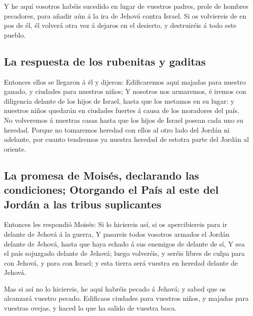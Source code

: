  Y he aquí vosotros habéis sucedido en lugar de vuestros
padres, prole de hombres pecadores, para añadir aún á la ira de Jehová
contra Israel.  Si os volviereis de en pos de él, él
volverá otra vez á dejaros en el desierto, y destruiréis á todo este
pueblo.

\hypertarget{la-respuesta-de-los-rubenitas-y-gaditas}{%
\subsection{La respuesta de los rubenitas y
gaditas}\label{la-respuesta-de-los-rubenitas-y-gaditas}}

 Entonces ellos se llegaron á él y dijeron: Edificaremos
aquí majadas para nuestro ganado, y ciudades para nuestros niños;
 Y nosotros nos armaremos, é iremos con diligencia delante
de los hijos de Israel, hasta que los metamos en su lugar: y nuestros
niños quedarán en ciudades fuertes á causa de los moradores del país.
 No volveremos á nuestras casas hasta que los hijos de
Israel posean cada uno su heredad.  Porque no tomaremos
heredad con ellos al otro lado del Jordán ni adelante, por cuanto
tendremos ya nuestra heredad de estotra parte del Jordán al oriente.

\hypertarget{la-promesa-de-moisuxe9s-declarando-las-condiciones-otorgando-el-pauxeds-al-este-del-jorduxe1n-a-las-tribus-suplicantes}{%
\subsection{La promesa de Moisés, declarando las condiciones; Otorgando
el País al este del Jordán a las tribus
suplicantes}\label{la-promesa-de-moisuxe9s-declarando-las-condiciones-otorgando-el-pauxeds-al-este-del-jorduxe1n-a-las-tribus-suplicantes}}

 Entonces les respondió Moisés: Si lo hiciereis así, si os
apercibiereis para ir delante de Jehová á la guerra,  Y
pasareis todos vosotros armados el Jordán delante de Jehová, hasta que
haya echado á sus enemigos de delante de sí,  Y sea el país
sojuzgado delante de Jehová; luego volveréis, y seréis libres de culpa
para con Jehová, y para con Israel; y esta tierra será vuestra en
heredad delante de Jehová.

 Mas si así no lo hiciereis, he aquí habréis pecado á
Jehová; y sabed que os alcanzará vuestro pecado.  Edificaos
ciudades para vuestros niños, y majadas para vuestras ovejas, y haced lo
que ha salido de vuestra boca.

